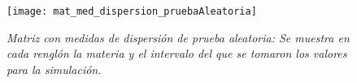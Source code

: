 \begin{figure}[H]
\centering
\texttt{[image: mat\_med\_dispersion\_pruebaAleatoria]} %
\caption[\textit{Matriz con medidas de dispersión de prueba aleatoria}]{\textit{Matriz con medidas de dispersión de prueba aleatoria: Se muestra en cada renglón la materia y el intervalo del que se tomaron los valores para la simulación.}}\label{mat_med_dispersion_pruebaAl}
\end{figure}
